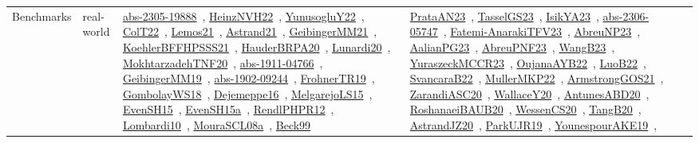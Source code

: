 {\begin{longtable}{lp{3cm}>{\raggedright\arraybackslash}p{6cm}>{\raggedright\arraybackslash}p{6cm}>{\raggedright\arraybackslash}p{8cm}}
Benchmarks & real-world & \href{../works/abs-2305-19888.pdf}{abs-2305-19888}~\cite{abs-2305-19888}, \href{../works/HeinzNVH22.pdf}{HeinzNVH22}~\cite{HeinzNVH22}, \href{../works/YunusogluY22.pdf}{YunusogluY22}~\cite{YunusogluY22}, \href{../works/ColT22.pdf}{ColT22}~\cite{ColT22}, \href{../works/Lemos21.pdf}{Lemos21}~\cite{Lemos21}, \href{../works/Astrand21.pdf}{Astrand21}~\cite{Astrand21}, \href{../works/GeibingerMM21.pdf}{GeibingerMM21}~\cite{GeibingerMM21}, \href{../works/KoehlerBFFHPSSS21.pdf}{KoehlerBFFHPSSS21}~\cite{KoehlerBFFHPSSS21}, \href{../works/HauderBRPA20.pdf}{HauderBRPA20}~\cite{HauderBRPA20}, \href{../works/Lunardi20.pdf}{Lunardi20}~\cite{Lunardi20}, \href{../works/MokhtarzadehTNF20.pdf}{MokhtarzadehTNF20}~\cite{MokhtarzadehTNF20}, \href{../works/abs-1911-04766.pdf}{abs-1911-04766}~\cite{abs-1911-04766}, \href{../works/GeibingerMM19.pdf}{GeibingerMM19}~\cite{GeibingerMM19}, \href{../works/abs-1902-09244.pdf}{abs-1902-09244}~\cite{abs-1902-09244}, \href{../works/FrohnerTR19.pdf}{FrohnerTR19}~\cite{FrohnerTR19}, \href{../works/GombolayWS18.pdf}{GombolayWS18}~\cite{GombolayWS18}, \href{../works/Dejemeppe16.pdf}{Dejemeppe16}~\cite{Dejemeppe16}, \href{../works/MelgarejoLS15.pdf}{MelgarejoLS15}~\cite{MelgarejoLS15}, \href{../works/EvenSH15.pdf}{EvenSH15}~\cite{EvenSH15}, \href{../works/EvenSH15a.pdf}{EvenSH15a}~\cite{EvenSH15a}, \href{../works/RendlPHPR12.pdf}{RendlPHPR12}~\cite{RendlPHPR12}, \href{../works/Lombardi10.pdf}{Lombardi10}~\cite{Lombardi10}, \href{../works/MouraSCL08a.pdf}{MouraSCL08a}~\cite{MouraSCL08a}, \href{../works/Beck99.pdf}{Beck99}~\cite{Beck99} & \href{../works/PrataAN23.pdf}{PrataAN23}~\cite{PrataAN23}, \href{../works/TasselGS23.pdf}{TasselGS23}~\cite{TasselGS23}, \href{../works/IsikYA23.pdf}{IsikYA23}~\cite{IsikYA23}, \href{../works/abs-2306-05747.pdf}{abs-2306-05747}~\cite{abs-2306-05747}, \href{../works/Fatemi-AnarakiTFV23.pdf}{Fatemi-AnarakiTFV23}~\cite{Fatemi-AnarakiTFV23}, \href{../works/AbreuNP23.pdf}{AbreuNP23}~\cite{AbreuNP23}, \href{../works/AalianPG23.pdf}{AalianPG23}~\cite{AalianPG23}, \href{../works/AbreuPNF23.pdf}{AbreuPNF23}~\cite{AbreuPNF23}, \href{../works/WangB23.pdf}{WangB23}~\cite{WangB23}, \href{../works/YuraszeckMCCR23.pdf}{YuraszeckMCCR23}~\cite{YuraszeckMCCR23}, \href{../works/OujanaAYB22.pdf}{OujanaAYB22}~\cite{OujanaAYB22}, \href{../works/LuoB22.pdf}{LuoB22}~\cite{LuoB22}, \href{../works/SvancaraB22.pdf}{SvancaraB22}~\cite{SvancaraB22}, \href{../works/MullerMKP22.pdf}{MullerMKP22}~\cite{MullerMKP22}, \href{../works/ArmstrongGOS21.pdf}{ArmstrongGOS21}~\cite{ArmstrongGOS21}, \href{../works/ZarandiASC20.pdf}{ZarandiASC20}~\cite{ZarandiASC20}, \href{../works/WallaceY20.pdf}{WallaceY20}~\cite{WallaceY20}, \href{../works/AntunesABD20.pdf}{AntunesABD20}~\cite{AntunesABD20}, \href{../works/RoshanaeiBAUB20.pdf}{RoshanaeiBAUB20}~\cite{RoshanaeiBAUB20}, \href{../works/WessenCS20.pdf}{WessenCS20}~\cite{WessenCS20}, \href{../works/TangB20.pdf}{TangB20}~\cite{TangB20}, \href{../works/AstrandJZ20.pdf}{AstrandJZ20}~\cite{AstrandJZ20}, \href{../works/ParkUJR19.pdf}{ParkUJR19}~\cite{ParkUJR19}, \href{../works/YounespourAKE19.pdf}{YounespourAKE19}~\cite{YounespourAKE19}, 
\end{longtable}}
